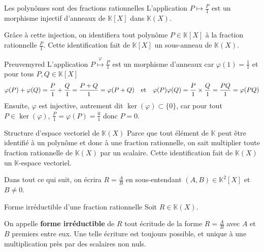     \begin{theo}{Les polynômes sont des fractions rationnelles}{}
        L’application $P \mapsto \frac{P}{1}$ est un morphisme injectif d’anneaux de $\mathbb{K}[X]$ dans $\mathbb{K}(X)$.

        Grâce à cette injection, on identifiera tout polynôme $P \in \mathbb{K}[X]$ à la fraction rationnelle $\frac{P}{1}$. Cette identification fait de $\mathbb{K}[X]$ un sous-anneau de $\mathbb{K}(X)$.
    \end{theo}

    \begin{demo}{Preuve}{myred}
        L’application $P \overset{\varphi}{\longmapsto} \frac{P}{1}$ est un morphisme d’anneaux car $\varphi(1) = \frac{1}{1}$ et pour tous $P,Q \in \mathbb{K}[X]$ 
        \[ \varphi(P) + \varphi(Q) = \frac{P}{1} + \frac{Q}{1} = \frac{P + Q}{1} = \varphi(P + Q) \quad \text{et} \quad \varphi(P)\varphi(Q) = \frac{P}{1} \times \frac{Q}{1} = \frac{PQ}{1} = \varphi(PQ) \]
        Ensuite, $\varphi$ est injective, autrement dit $\ker(\varphi) \subset \{0\}$, car pour tout $P \in \ker(\varphi)$, $\frac{P}{1} = \varphi(P) = \frac{0}{1}$ donc $P = 0$.
    \end{demo}

    \begin{theo}{Structure d’espace vectoriel de $\mathbb{K}(X)$}{}
        Parce que tout élément de $\mathbb{K}$ peut être identifié à un polynôme et donc à une fraction rationnelle, on sait multiplier toute fraction rationnelle de $\mathbb{K}(X)$ par un scalaire. Cette identification fait de $\mathbb{K}(X)$ un $\mathbb{K}$-espace vectoriel.
    \end{theo}

    Dans tout ce qui suit, on écrira $R = \frac{A}{B}$ en sous-entendant $(A,B) \in \mathbb{K}^2[X]$ et $B \neq 0$.

    \begin{defi}{Forme irréductible d’une fraction rationnelle}{}
        Soit $R \in \mathbb{K}(X)$. 

        On appelle \textbf{forme irréductible} de $R$ tout écritude de la forme $R = \frac{A}{B}$ avec $A$ et $B$ premiers entre eux. Une telle écriture est toujours possible, et unique à une multiplication près par des scalaires non nuls.
    \end{defi}

